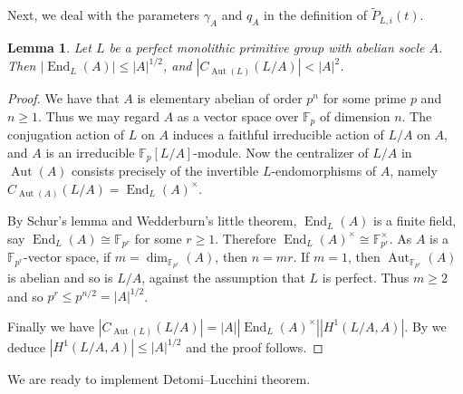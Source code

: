 \documentclass[11pt,reqno]{amsart}
\numberwithin{equation}{section}
\newtheorem{lemma}[theorem]{Lemma}
\theoremstyle{definition}
\theoremstyle{remark}
\newcommand{\Aut}{\mathop{\mathrm{Aut}}}
\newcommand{\End}{\mathop{\mathrm{End}}}
\begin{document}
Next, we deal with the parameters $\gamma_A$ and $q_A$ in the definition of $\widetilde{P}_{L,i}(t)$.

\begin{lemma} \label{lemComp}
Let $L$ be a perfect monolithic primitive group with abelian socle $A$.
Then $|\End_L(A)| \leq |A|^{1/2}$, and $|C_{\Aut(L)}(L/A)| < |A|^2$.
\end{lemma}
\begin{proof}
 We have that $A$ is elementary abelian of order $p^n$ for some prime $p$ and $n \geq 1$.
Thus we may regard $A$ as a vector space over $\mathbb{F}_p$ of dimension $n$.
The conjugation action of $L$ on $A$ induces a faithful irreducible action of
$L/A$ on $A$, and $A$ is an irreducible $\mathbb{F}_p[L/A]$-module.
Now the centralizer of $L/A$ in $\Aut(A)$ consists precisely of the invertible
$L$-endomorphisms of $A$, namely $C_{\Aut(A)}(L/A) = \End_L(A)^\times$.

By Schur's lemma and Wedderburn's little theorem, $\End_L(A)$ is a finite field,
say $\End_L(A) \cong \mathbb{F}_{p^r}$ for some $r \geq 1$.
Therefore $\End_L(A)^\times \cong \mathbb{F}_{p^r}^\times$.
As $A$ is a $\mathbb{F}_{p^r}$-vector space, if $m=\dim_{\mathbb{F}_{p^r}}(A)$, then $n=mr$.
If $m=1$, then $\Aut_{\mathbb{F}_{p^r}}(A)$ is abelian and so is $L/A$,
against the assumption that $L$ is perfect.
Thus $m \geq 2$ and so $p^r \leq p^{n/2} = |A|^{1/2}$.

Finally we have $|C_{\Aut(L)}(L/A)| = |A| |\End_L(A)^\times| |H^1(L/A,A)|$.
By \cite[Theorem~1]{GH98} we deduce $|H^1(L/A,A)| \leq |A|^{1/2}$ and the proof follows.
\end{proof}

We are ready to implement Detomi--Lucchini theorem.
\end{document}
